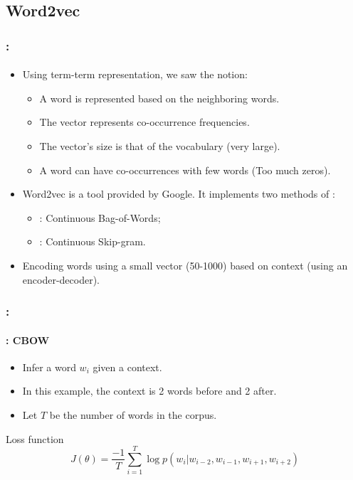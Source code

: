 \documentclass[xcolor=table]{beamer}
\begin{document}
\subsection{Word2vec}

\begin{frame}
	\frametitle{\insertshortsubtitle: \insertsection}
	\framesubtitle{\insertsubsection}

	\begin{itemize}
		\item Using term-term representation, we saw the  notion:
		\begin{itemize}
			\item A word is represented based on the neighboring words.
			\item The vector represents co-occurrence frequencies.
			\item The vector's size is that of the vocabulary (very large).
			\item A word can have co-occurrences with few words (Too much zeros).
		\end{itemize}
		\item Word2vec is a tool provided by Google. It implements two methods of  \cite{2013-mikolov-al}:
		\begin{itemize}
			\item {}: Continuous Bag-of-Words;
			\item {}: Continuous Skip-gram.
		\end{itemize}
		\item Encoding words using a small vector (50-1000) based on context (using an encoder-decoder).
	\end{itemize}

\end{frame}

\begin{frame}
	\frametitle{\insertshortsubtitle: \insertsection}
	\framesubtitle{\insertsubsection: CBOW}
	
	\begin{minipage}{.63\textwidth}
		\begin{itemize}
			\item Infer a word $w_i$ given a context.
			\item In this example, the context is 2 words before and 2 after.
			\item Let $T$ be the number of words in the corpus.
		\end{itemize}
		\begin{block}{Loss function}
			\[%
			J(\theta) = \frac{-1}{T} \sum_{i=1}^{T} \log p(w_i |w_{i-2}, w_{i-1}, w_{i+1}, w_{i+2})
			\]
		\end{block}
	\end{minipage}
	\begin{minipage}{.36\textwidth}
	\end{minipage}
	
\end{frame}
\end{document}
